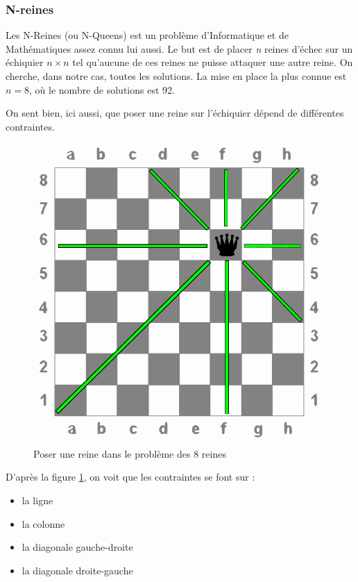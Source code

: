 \documentclass[a4paper]{article}
\begin{document}
\subsubsection{N-reines}

Les N-Reines (ou N-Queens) est un problème d'Informatique et de Mathématiques 
assez connu lui aussi. 
Le but est de placer \emph{n} reines d'échec sur un échiquier $ n \times n $ tel
qu'aucune de ces reines ne puisse attaquer une autre reine. On cherche,
dans notre cas, toutes les solutions.
La mise en place la plus connue est $ n = 8 $, où le nombre de solutions est 
92. 

On sent bien, ici aussi, que poser une reine sur l'échiquier dépend de
différentes contraintes. 

\begin{figure}[h]
\begin{center}
\includegraphics[height=0.2\textheight]{../imports/8queens.pdf}
\caption{\label{8queens} Poser une reine dans le problème des 8 reines}
\end{center}
\end{figure}

D'après la figure \ref{8queens}, on voit que les contraintes se font sur : 
\begin{itemize}
\item la ligne
\item la colonne
\item la diagonale gauche-droite
\item la diagonale droite-gauche
\end{itemize}
\end{document}
